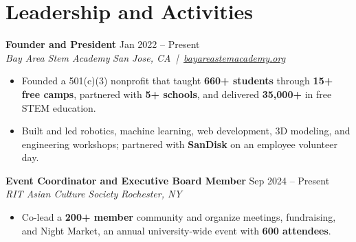 \documentclass[10pt,letterpaper]{article}
\newif\ifresumeFirstRole
\newcommand{\resumeRole}[4]{%
  \ifresumeFirstRole
    \global\resumeFirstRolefalse
  \else
    \vspace{0pt plus 1fill}%
  \fi
  \textbf{#1} \hfill #2\\
  \textit{#3} \hfill \textit{#4}
}
\begin{document}
\section*{Leadership and Activities}
\resumeRole{Founder and President}{Jan 2022 -- Present}{Bay Area Stem Academy}{San Jose, CA \,|\, \href{https://bayareastemacademy.org}{bayareastemacademy.org}}
\begin{itemize}
  \item Founded a 501(c)(3) nonprofit that taught \textbf{660+ students} through \textbf{15+ free camps}, partnered with \textbf{5+ schools}, and delivered \textbf{\textdollar{}35,000+} in free STEM education.
  \item Built and led robotics, machine learning, web development, 3D modeling, and engineering workshops; partnered with \textbf{SanDisk} on an employee volunteer day.
\end{itemize}

\resumeRole{Event Coordinator and Executive Board Member}{Sep 2024 -- Present}{RIT Asian Culture Society}{Rochester, NY}
\begin{itemize}
  \item Co-lead a \textbf{200+ member} community and organize meetings, fundraising, and Night Market, an annual university-wide event with \textbf{600 attendees}.
\end{itemize}
\end{document}
